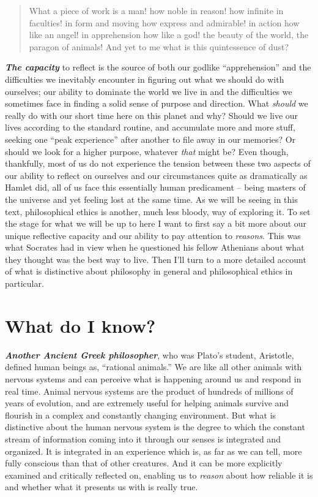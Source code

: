 \documentclass[12pt, openany]{book}
\begin{document}
\begin{quote}
What a piece of work is a man! how noble in reason! how infinite in faculties! in form and moving how express and admirable! in action how like an angel! in apprehension how like a god! the beauty of the world, the paragon of animals! And yet to me what is this quintessence of dust?
\end{quote}

\textbf{\emph{The capacity}} to reflect is the source of both our godlike ``apprehension'' and the difficulties we inevitably encounter in figuring out what we should do with ourselves; our ability to dominate the world we live in and the difficulties we sometimes face in finding a solid sense of purpose and direction. What \emph{should} we really do with our short time here on this planet and why? Should we live our lives according to the standard routine, and accumulate more and more stuff, seeking one ``peak experience'' after another to file away in our memories? Or should we look for a higher purpose, whatever \emph{that} might be? Even though, thankfully, most of us do not experience the tension between these two aspects of our ability to reflect on ourselves and our circumstances quite as dramatically as Hamlet did, all of us face this essentially human predicament -- being masters of the universe and yet feeling lost at the same time. As we will be seeing in this text, philosophical ethics is another, much less bloody, way of exploring it. To set the stage for what we will be up to here I want to first say a bit more about our unique reflective capacity and our ability to pay attention to \emph{reasons}. This was what Socrates had in view when he questioned his fellow Athenians about what they thought was the best way to live. Then I'll turn to a more detailed account of what is distinctive about philosophy in general and philosophical ethics in particular.

\hypertarget{what-do-i-know}{%
\section{What do I know?}\label{what-do-i-know}}

\textbf{\emph{Another Ancient Greek philosopher}}, who was Plato's student, Aristotle, defined human beings as, ``rational animals.'' We are like all other animals with nervous systems and can perceive what is happening around us and respond in real time. Animal nervous systems are the product of hundreds of millions of years of evolution, and are extremely useful for helping animals survive and flourish in a complex and constantly changing environment. But what is distinctive about the human nervous system is the degree to which the constant stream of information coming into it through our senses is integrated and organized. It is integrated in an experience which is, as far as we can tell, more fully conscious than that of other creatures. And it can be more explicitly examined and critically reflected on, enabling us to \emph{reason} about how reliable it is and whether what it presents us with is really true.
\end{document}
